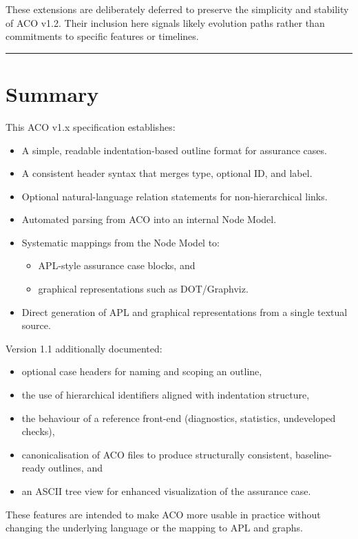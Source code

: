 \documentclass[11pt]{article}
\begin{document}
These extensions are deliberately deferred to preserve the simplicity and
stability of ACO v1.2. Their inclusion here signals likely evolution paths
rather than commitments to specific features or timelines.

\bigskip
\hrule
\bigskip

\section{Summary}

This ACO v1.x specification establishes:

\begin{itemize}[leftmargin=2em]
  \item A simple, readable indentation-based outline format for assurance cases.
  \item A consistent header syntax that merges type, optional ID, and label.
  \item Optional natural-language relation statements for non-hierarchical links.
  \item Automated parsing from ACO into an internal Node Model.
  \item Systematic mappings from the Node Model to:
  \begin{itemize}[leftmargin=1.5em]
    \item APL-style assurance case blocks, and
    \item graphical representations such as DOT/Graphviz.
  \end{itemize}
  \item Direct generation of APL and graphical representations from a single textual source.
\end{itemize}

Version 1.1 additionally documented:
\begin{itemize}[leftmargin=2em]
  \item optional case headers for naming and scoping an outline,
  \item the use of hierarchical identifiers aligned with indentation structure,
  \item the behaviour of a reference front-end (diagnostics, statistics, undeveloped checks),
  \item canonicalisation of ACO files to produce structurally consistent, baseline-ready outlines, and
  \item an ASCII tree view for enhanced visualization of the assurance case.
\end{itemize}
These features are intended to make ACO more usable in practice without changing the underlying language or the mapping to APL and graphs.
\end{document}
